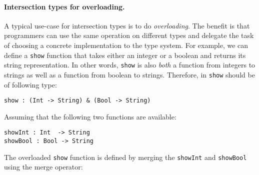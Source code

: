 \begin{comment}
The following table
summarizes the extent of support for intersection types in Java,
Scala, and \name.

\hspace{-13pt}\begin{tabular}{ l | c | c | c  }
                                   & Java       & Scala      & \name      \\ \hline
  Basic intersection types         & \checkmark & \checkmark & \checkmark \\ \hline
  Anonymous intersection types     &            & \checkmark & \checkmark \\ \hline
  Intersection of type parameters  &            & \checkmark & \checkmark \\ \hline
  Term-level intersection          &            &            & \checkmark 
\end{tabular} \\
\end{comment}


\paragraph{Intersection types for overloading.} 
A typical use-case for intersection types is to do
\emph{overloading}. The benefit is that programmers can use the same
operation on different types and delegate the task of choosing a
concrete implementation to the type system. For example, we can define
a \lstinline{show} function that takes either an integer or a boolean
and returns its string representation. In other words, \lstinline{show} is also
\emph{both} a function from integers to strings as well as a function
from boolean to strings.  Therefore, in \name \lstinline{show} should be of
following type:
\begin{lstlisting}
show : (Int -> String) & (Bool -> String)
\end{lstlisting}
Assuming that the following two functions are available:
\begin{lstlisting}
showInt : Int  -> String 
showBool : Bool -> String
\end{lstlisting}

\noindent The overloaded \lstinline{show} function is defined by
merging the \lstinline{showInt} and \lstinline{showBool} using the
merge operator:

